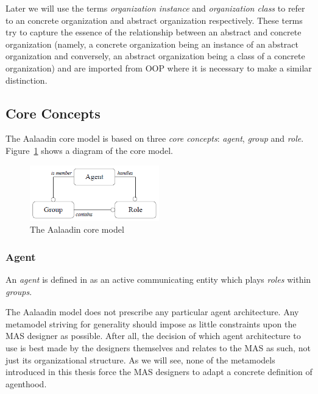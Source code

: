 Later we will use the terms \textit{organization instance} and \textit{organization class} to refer to an concrete organization and abstract organization respectively.
These terms try to capture the essence of the relationship between an abstract and concrete organization (namely, a concrete organization being an instance of an abstract organization and conversely, an abstract organization being a class of a concrete organization) and are imported from OOP where it is necessary to make a similar distinction. 

\subsection{Core Concepts}

The Aalaadin core model is based on three \textit{core concepts}: \textit{agent}, \textit{group} and \textit{role}.
Figure~\ref{figure:aalaadin-core-model} shows a diagram of the core model.

\begin{figure}
\centering
\includegraphics[width=0.5\textwidth]{images/aalaadin-core-model.png}
\caption{The Aalaadin core model}
\label{figure:aalaadin-core-model}
\end{figure}

\subsubsection*{Agent}

An \textit{agent} is defined in \cite{Ferber97} as an active communicating entity which plays \textit{roles} within \textit{groups}.

The Aalaadin model does not prescribe any particular agent architecture.
Any metamodel striving for generality should impose as little constraints upon the MAS designer as possible.
After all, the decision of which agent architecture to use is best made by the designers themselves and relates to the MAS as such, not just its organizational structure.
As we will see, none of the metamodels introduced in this thesis force the MAS designers to adapt a concrete definition of agenthood.

